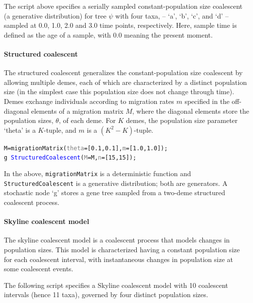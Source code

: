 \documentclass[10pt,letterpaper,table]{article}
\begin{document}
The script above specifies a serially sampled constant-population size coalescent (a generative distribution) for tree $\psi$ with four taxa, -- `a', `b', `c', and `d' -- sampled at 0.0, 1.0, 2.0 and 3.0 time points, respectively. Here, sample time is defined as the age of a sample, with 0.0 meaning the present moment.

\paragraph{Structured coalescent}
The structured coalescent \cite{hudson1990oxford, notohara1990coalescent} generalizes the constant-population size coalescent \cite{kingman82} by allowing multiple demes, each of which are characterized by a distinct population size (in the simplest case this population size does not change through time).
Demes exchange individuals according to migration rates $m$ specified in the off-diagonal elements of a migration matrix $M$, where the diagonal elements store the population sizes, $\theta$, of each deme.
For $K$ demes, the population size parameter `theta' is a $K$-tuple, and $m$ is a $(K^2-K)$-tuple.

{\small
  \begin{alltt}
    M = \textcolor{generator}{migrationMatrix}(\textcolor{gray}{theta}=[\textcolor{constant}{0.1}, \textcolor{constant}{0.1}], \textcolor{gray}{m}=[\textcolor{constant}{1.0}, \textcolor{constant}{1.0}]);
    \textcolor{bluishgreen}{g} ~ \textcolor{blue}{StructuredCoalescent}(\textcolor{gray}{M}=M, \textcolor{gray}{n}=[\textcolor{constant}{15}, \textcolor{constant}{15}]);
  \end{alltt}
}

In the above, \texttt{migrationMatrix} is a deterministic function and \texttt{StructuredCoalescent} is a generative distribution; both are generators. A stochastic node `g' stores a gene tree sampled from a two-deme structured coalescent process.

\paragraph{Skyline coalescent model}
The skyline coalescent model \cite{drummond2005bayesian} is a coalescent process that models changes in population sizes.
This model is characterized having a constant population size for each coalescent interval, with instantaneous changes in population size at some coalescent events.

The following script specifies a Skyline coalescent model with 10 coalescent intervals (hence 11 taxa), governed by four distinct population sizes.
\end{document}

